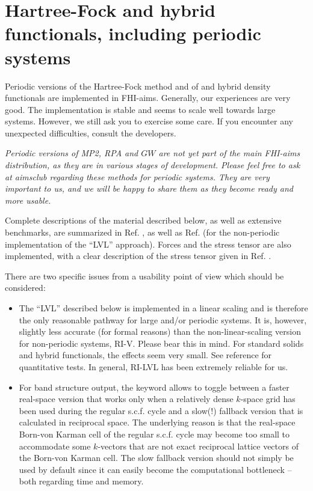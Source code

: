 \section{Hartree-Fock and hybrid functionals, including periodic systems}
\label{Sec:periodic_hf}

Periodic versions of the Hartree-Fock method and of and hybrid density
functionals are implemented in FHI-aims. Generally, our experiences are
very good. The implementation is stable and seems to scale well
towards large systems. However, we still ask you to exercise some
care. If you encounter any unexpected difficulties, 
consult the developers.

\emph{Periodic versions of MP2, RPA and $GW$ are not yet part of the 
main FHI-aims 
distribution, as they are in various stages of development. Please feel
free to ask at aimsclub regarding these methods for periodic systems.
They are very important to us, and we will be happy to share them as
they become ready and more usable.}

Complete descriptions of the material described below, as well as
extensive benchmarks, are summarized in Ref. \cite{Levchenko2015}, as
well as Ref. \cite{Ihrig2015} (for the non-periodic implementation of
the ``LVL'' approach). Forces and the stress tensor are also
implemented, with a clear description of the stress tensor given in
Ref. \cite{Knuth2015}. 

There are two specific issues from a usability point of view which
should be considered:
\begin{itemize}
\item The  ``LVL'' described below is
    implemented in a linear scaling and is therefore the only reasonable
    pathway for large and/or periodic systems. It is, however, slightly less
    accurate (for formal reasons) than the non-linear-scaling version for non-periodic
    systems, RI-V. Please bear this in mind. For standard solids and
    hybrid functionals, the effects seem very small. See
    reference \cite{Ihrig2015} for quantitative tests. In general,
    RI-LVL has been extremely reliable for us.
  \item For band structure output, the
     keyword  allows to toggle
    between a faster real-space version that works only when a relatively dense
    $k$-space grid has been used during the regular s.c.f. cycle and
    a slow(!) fallback version that is calculated in reciprocal space.
    The underlying reason is that the real-space Born-von Karman cell of
    the regular s.c.f. cycle may become too small to accommodate some
    $k$-vectors that are not exact reciprocal lattice vectors of the
    Born-von Karman cell. The slow fallback version should not simply be
    used by default since it can easily become the computational bottleneck --
    both regarding time and memory.
\end{itemize}

